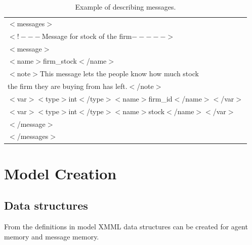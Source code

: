 \documentclass[a4paper,11pt]{article}
\begin{document}
\begin{table}
\centering %
\begin{tabular}{|l|}
\hline $<$messages$>$\\ $<!---$Message for stock of the firm$----->$ \\
$<$message$>$ \\$<$name$>$firm\_stock$<$/name$>$\\
$<$note$>$This message lets the people know how much stock\\
the firm they are buying from has left.$<$/note$>$\\
$<$var$><$type$>$int$<$/type$><$name$>$firm\_id$<$/name$><$/var$>$\\
$<$var$><$type$>$int$<$/type$><$name$>$stock$<$/name$><$/var$>$\\
$<$/message$>$\\ $<$/messages$>$\\
 \hline
\end{tabular}
\caption{Example of describing messages.} \label{tab:msg}
\end{table}

\pagebreak
\clearpage

\section{Model Creation}

\subsection{Data structures}
From the definitions in model XMML data structures can be created
for agent memory and message memory.
\end{document}
